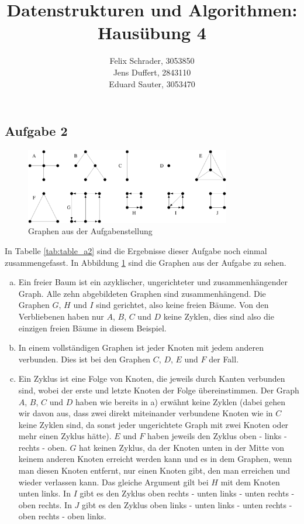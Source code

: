 \documentclass[11pt]{article}
\author{
  Felix Schrader, 3053850 \\ 
  Jens Duffert, 2843110 \\
  Eduard Sauter, 3053470
}
\title{Datenstrukturen und Algorithmen: Haus\"ubung 4}
\begin{document}
\maketitle

\subsection*{Aufgabe 2}
\begin{figure}[h!]
  \centering
  \includegraphics[width=0.8\textwidth]{a2_graphs.png}
  \caption{Graphen aus der Aufgabenstellung}
  \label{fig:a2_graphs}
\end{figure}
In Tabelle \ref{tab:table_a2} sind die Ergebnisse dieser Aufgabe noch einmal
zusammengefasst. In Abbildung \ref{fig:a2_graphs} sind die Graphen aus der Aufgabe zu
sehen.
\begin{enumerate}[a)]
  \item
    Ein freier Baum ist ein azyklischer, ungerichteter und zusammenhängender
    Graph. Alle zehn abgebildeten Graphen sind zusammenhängend. Die Graphen $G$,
    $H$ und $I$ sind gerichtet, also keine freien Bäume. Von den Verbliebenen
    haben nur $A$, $B$, $C$ und $D$ keine Zyklen, dies sind also die einzigen
    freien Bäume in diesem Beispiel.
  \item
    In einem vollständigen Graphen ist jeder Knoten mit jedem anderen verbunden.
    Dies ist bei den Graphen $C$, $D$, $E$ und $F$ der Fall.
  \item
    Ein Zyklus ist eine Folge von Knoten, die jeweils durch Kanten verbunden
    sind, wobei der erste und letzte Knoten der Folge übereinstimmen. Der Graph
    $A$, $B$, $C$ und $D$ haben wie bereits in a) erwähnt keine Zyklen (dabei
    gehen wir davon aus, dass zwei direkt miteinander verbundene Knoten wie in
    $C$ keine Zyklen sind, da sonst jeder ungerichtete Graph mit zwei Knoten
    oder mehr einen Zyklus hätte). $E$ und $F$ haben jeweils den Zyklus
    \textsf{oben - links - rechts - oben}. $G$ hat keinen Zyklus, da der Knoten
    unten in der Mitte von keinem anderen Knoten erreicht werden kann und es in
    dem Graphen, wenn man diesen Knoten entfernt, nur einen Knoten gibt, den man
    erreichen und wieder verlassen kann. Das gleiche Argument gilt bei $H$ mit
    dem Knoten unten links. In $I$ gibt es den Zyklus
    \textsf{oben rechts - unten links - unten rechts - oben rechts}. In $J$ gibt
    es den Zyklus
    \textsf{oben links - unten links - unten rechts - oben rechts - oben links}.
\end{enumerate}
\end{document}
